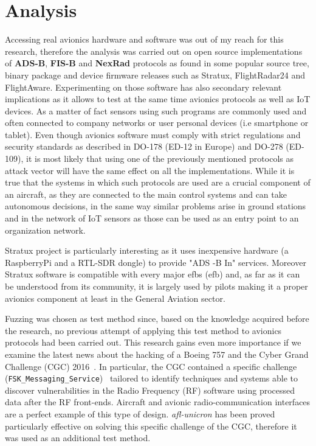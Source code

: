 \documentclass[../main.tex]{subfiles}
\begin{document}
\chapter{Analysis}
\label{chap:experimsetup}

Accessing real avionics hardware and software was out of my reach for this
research, therefore the analysis was carried out on open source implementations
of \textbf{ADS-B}, \textbf{FIS-B} and \textbf{NexRad} protocols as found in some
popular source tree, binary package and device firmware releases such as
Stratux, FlightRadar24 and FlightAware. Experimenting on those software has also
secondary relevant implications as it allows to test at the same time avionics
protocols as well as IoT devices. As a matter of fact sensors using such programs are commonly used and often connected to company networks or user personal devices (i.e smartphone or tablet). Even though avionics software must comply with strict regulations and security standards as described in DO-178 (ED-12 in Europe) and DO-278 (ED-109), it is most likely that using one of the previously mentioned protocols as attack vector will have the same effect on all the implementations. While it is true that the systems in which such protocols are used are a crucial component of an aircraft, as they are connected to the main control systems and can take autonomous decisions, in the same way similar problems arise in ground stations and in the network of IoT sensors as those can be used as an entry point to an organization network.

Stratux project is particularly interesting as it uses inexpensive hardware (a
RaspberryPi and a RTL-SDR dongle) to provide "ADS -B In" services.
Moreover Stratux software is compatible with every major \acrlong{efb}s
(\acrshort{efb}) and, as far as it can be understood from its community, it is
largely used by pilots making it a proper avionics component at least in the
General Aviation sector.

Fuzzing was chosen as test method since, based on the knowledge acquired before
the research, no previous attempt of applying this test method to avionics
protocols had been carried out. This research gains even more importance if we
examine the latest news about the hacking of a Boeing 757 and the Cyber Grand
Challenge (CGC) 2016~\cite{CGC}. In particular, the CGC contained a specific
challenge (\texttt{FSK\_Messaging\_Service})~\cite{CGC-FSK} tailored to identify
techniques and systems able to discover vulnerabilities in the Radio Frequency
(RF) software using processed data after the RF front-ends. Aircraft and avionic
radio-communication interfaces are a perfect example of this type of design.
\textit{afl-unicron} has been proved particularly effective on solving this
specific challenge of the CGC, therefore it was used as an additional test
method.
\end{document}
